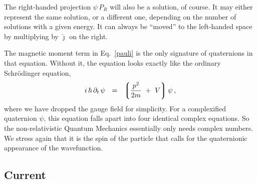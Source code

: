 \documentclass[epsfig,12pt]{article}
\newcommand{\p}{\partial}
\newcommand{\lgr}{\left\lgroup}
\newcommand{\rgr}{\right\rgroup}
\newcommand{\jj}{\hat\jmath}
\begin{document}
	The right-handed projection $ \psi\,P_R $ will also be a solution, of course.
	It may either represent the same solution, or a different one,
	depending on the number of solutions with a given energy.
	It can always be ``moved'' to the left-handed space by multiplying by $ \jj $
	on the right.

	The magnetic moment term in Eq.~\eqref{pauli} is the only signature of quaternions
	in that equation.
	Without it, the equation looks exactly like the ordinary Schr\"odinger equation,
\begin{equation}
\label{simple-schrod}
	i\,\hbar\,\p_t\,\psi	~~=~~
		\lgr
			\frac {p^2} {2m}
			~+~  V
		\rgr \psi\,,
\end{equation}
	where we have dropped the gauge field for simplicity.
	For a complexified quaternion $ \psi $, this equation falls apart into four
	identical complex equations.
	So the non-relativistic Quantum Mechanics essentially only needs complex numbers.
	We stress again that it is the spin of the particle that calls for the
	quaternionic appearance of the wavefunction.
	

\subsection{Current}
\label{sec-current}
\end{document}
